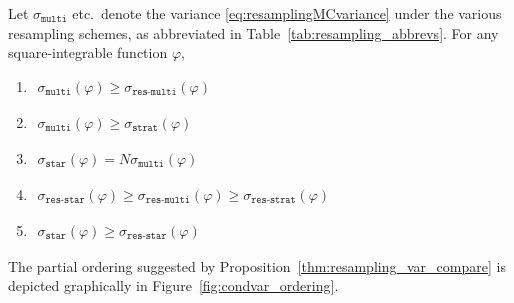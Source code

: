 \begin{prop}\label{thm:resampling_var_compare}
Let $\sigma_{\texttt{multi}}$ etc.\ denote the variance \eqref{eq:resamplingMCvariance} under the various resampling schemes, as abbreviated in Table~\ref{tab:resampling_abbrevs}.
For any square-integrable function $\varphi$,
\begin{enumerate}[label=(\alph*)]
\item \label{item:resampling_var1} \hspace{5pt}
$\begin{aligned}
    \sigma_{\texttt{multi}}(\varphi) 
    \geq \sigma_{\texttt{res-multi}}(\varphi)
\end{aligned}$
\item \label{item:resampling_var2} \hspace{5pt}
$\begin{aligned}
    \sigma_{\texttt{multi}}(\varphi) 
    \geq \sigma_{\texttt{strat}}(\varphi)
\end{aligned}$
\item \label{item:resampling_var3} \hspace{5pt}
$\begin{aligned}
    \sigma_{\texttt{star}}(\varphi) 
    = N \sigma_{\texttt{multi}}(\varphi)
\end{aligned}$
\item \label{item:resampling_var4} \hspace{5pt}
$\begin{aligned}
    \sigma_{\texttt{res-star}}(\varphi) 
    \geq \sigma_{\texttt{res-multi}}(\varphi) 
    \geq \sigma_{\texttt{res-strat}}(\varphi)
\end{aligned}$
\item \label{item:resampling_var5} \hspace{5pt}
$\begin{aligned}
    \sigma_{\texttt{star}}(\varphi) 
    \geq \sigma_{\texttt{res-star}}(\varphi) 
\end{aligned}$
\end{enumerate}
\end{prop}
The partial ordering suggested by Proposition~\ref{thm:resampling_var_compare} is depicted graphically in Figure~\ref{fig:condvar_ordering}.

